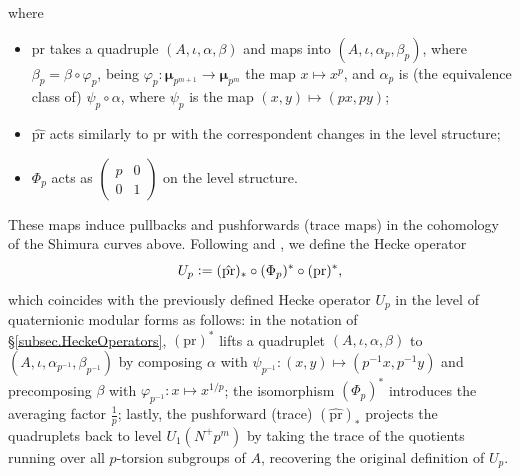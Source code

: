\documentclass[a4paper]{amsart}
\numberwithin{equation}{section}
\theoremstyle{definition}
\newcommand{\defeq}{\vcentcolon=}
\begin{document}
\begin{center}
\end{center}
where

\begin{itemize}
\item $\mathrm{pr}$ takes a quadruple $(A,\iota,\alpha,\beta)$ and maps into $(A,\iota,\alpha_p,\beta_p)$, where $\beta_p=\beta\circ\varphi_p$, being $\varphi_p\colon\boldsymbol{\mu}_{p^{m+1}}\to\boldsymbol{\mu}_{p^{m}}$ the map $x\mapsto x^p$, and $\alpha_p$ is (the equivalence class of) $\psi_p\circ\alpha$, where $\psi_p$ is the map $(x,y)\mapsto (px,py)$;

\item $\hat{\mathrm{pr}}$ acts similarly to $\mathrm{pr}$ with the correspondent changes in the level structure;

\item $\Phi_p$ acts as $\left(\begin{smallmatrix}p & 0 \\ 0 & 1\end{smallmatrix}\right)$ on the level structure.
\end{itemize}

These maps induce pullbacks and pushforwards (trace maps) in the cohomology of the Shimura curves above. Following \cite[\S 2.4]{KingsLoefflerZerbes.ERL} and \cite[\S 2.9]{Kato}, we define the Hecke operator \[U_p\defeq (\hat{\mathrm{pr}})_*\circ(\Phi_p)^*\circ(\mathrm{pr})^*,\] which coincides with the previously defined Hecke operator $U_p$ in the level of quaternionic modular forms as follows: in the notation of \S\ref{subsec.HeckeOperators}, $(\mathrm{pr})^*$ lifts a quadruplet $(A,\iota,\alpha,\beta)$ to $(A,\iota,\alpha_{p^{-1}},\beta_{p^{-1}})$ by composing $\alpha$ with $\psi_{p^{-1}}\colon(x,y)\mapsto (p^{-1}x,p^{-1}y)$ and precomposing $\beta$ with $\varphi_{p^{-1}}\colon x\mapsto x^{1/p}$; the isomorphism $(\Phi_p)^*$ introduces the averaging factor $\frac{1}{p}$; lastly, the pushforward (trace) $(\hat{\mathrm{pr}})_*$ projects the quadruplets back to level $U_1(N^+p^m)$ by taking the trace of the quotients running over all $p$-torsion subgroups of $A$, recovering the original definition of $U_p$.
\end{document}
